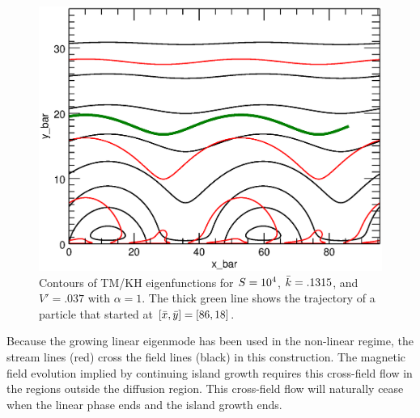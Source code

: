 	\begin{figure}[htbp]
	\caption{Contours of TM/KH eigenfunctions for $S=10^4$, $\bar{k}=.1315$, and $V' = .037$  with $\alpha = 1$. The thick green line shows the trajectory of a particle that started at $[\bar{x},\bar{y}]=[86,18]$. }
	\label{fig:contour_sat}
	
	\centerline{\includegraphics[scale=.8]{ParkerLongcope2017/contour_saturated.eps}}

	\end{figure}

	
Because the growing linear eigenmode has been used in the non-linear regime, the stream lines (red) cross the field lines (black) in this construction.  The magnetic field evolution implied by continuing island growth requires this cross-field flow in the regions outside the diffusion region.   This cross-field flow will naturally cease when the linear phase ends and the island growth ends.
	
